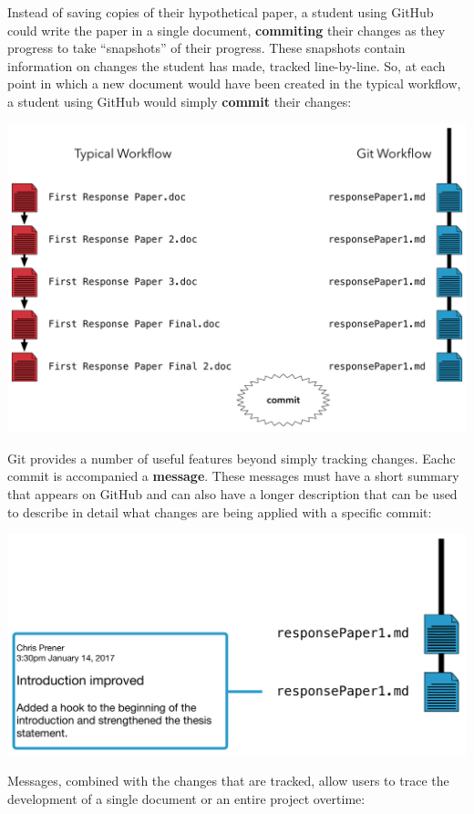 \documentclass[]{book}
\begin{document}
Instead of saving copies of their hypothetical paper, a student using
GitHub could write the paper in a single document, \textbf{commiting}
their changes as they progress to take ``snapshots'' of their progress.
These snapshots contain information on changes the student has made,
tracked line-by-line. So, at each point in which a new document would
have been created in the typical workflow, a student using GitHub would
simply \textbf{commit} their changes:

\includegraphics[width=1\linewidth]{images/gitFlow02}

Git provides a number of useful features beyond simply tracking changes.
Eachc commit is accompanied a \textbf{message}. These messages must have
a short summary that appears on GitHub and can also have a longer
description that can be used to describe in detail what changes are
being applied with a specific commit:

\includegraphics[width=1\linewidth]{images/gitFlow03}

Messages, combined with the changes that are tracked, allow users to
trace the development of a single document or an entire project
overtime:
\end{document}
